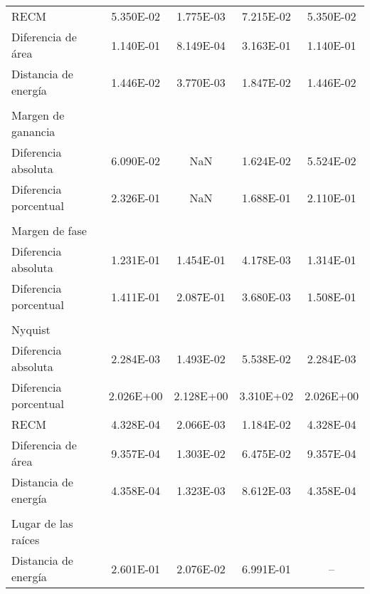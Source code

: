 {\begin{longtable}{l @{\extracolsep{\fill}} cccc}
            RECM                   & \num{5.350E-02} & \num{1.775E-03} & \num{7.215E-02} & \num{5.350E-02}  \\
            Diferencia de área     & \num{1.140E-01} & \num{8.149E-04} & \num{3.163E-01} & \num{1.140E-01}  \\
            Distancia de energía   & \num{1.446E-02} & \num{3.770E-03} & \num{1.847E-02} & \num{1.446E-02}  \\
            & & & & \\
            Margen de ganancia     & & & & \\ \cmidrule{1-1}
            Diferencia absoluta    & \num{6.090E-02} &        NaN      & \num{1.624E-02} & \num{5.524E-02}  \\
            Diferencia porcentual  & \num{2.326E-01} &        NaN      & \num{1.688E-01} & \num{2.110E-01}  \\
            & & & & \\
            Margen de fase         & & & & \\ \cmidrule{1-1}
            Diferencia absoluta    & \num{1.231E-01} & \num{1.454E-01} & \num{4.178E-03} & \num{1.314E-01}  \\
            Diferencia porcentual  & \num{1.411E-01} & \num{2.087E-01} & \num{3.680E-03} & \num{1.508E-01}  \\
            & & & & \\
            Nyquist                & & & & \\ \cmidrule{1-1}
            Diferencia absoluta    & \num{2.284E-03} & \num{1.493E-02} & \num{5.538E-02} & \num{2.284E-03}  \\
            Diferencia porcentual  & \num{2.026E+00} & \num{2.128E+00} & \num{3.310E+02} & \num{2.026E+00}  \\
            RECM                   & \num{4.328E-04} & \num{2.066E-03} & \num{1.184E-02} & \num{4.328E-04}  \\
            Diferencia de área     & \num{9.357E-04} & \num{1.303E-02} & \num{6.475E-02} & \num{9.357E-04}  \\
            Distancia de energía   & \num{4.358E-04} & \num{1.323E-03} & \num{8.612E-03} & \num{4.358E-04}  \\
            & & & & \\
            Lugar de las raíces    & & & & \\ \cmidrule{1-1}
            Distancia de energía   & \num{2.601E-01} & \num{2.076E-02} & \num{6.991E-01} &        --        \\

\end{longtable}}
